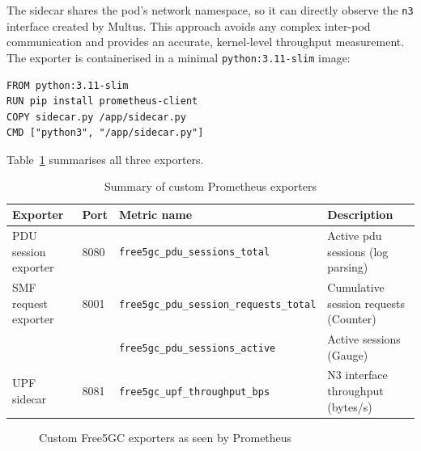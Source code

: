 The sidecar shares the pod's network namespace, so it can directly observe the \texttt{n3} interface created by Multus. This approach avoids any complex inter-pod communication and provides an accurate, kernel-level throughput measurement. The exporter is containerised in a minimal \texttt{python:3.11-slim} image:

\begin{lstlisting}[language=docker, caption={Dockerfile for the UPF sidecar exporter}, label={lst:upf_sidecar_dockerfile}]
FROM python:3.11-slim
RUN pip install prometheus-client
COPY sidecar.py /app/sidecar.py
CMD ["python3", "/app/sidecar.py"]
\end{lstlisting}

Table~\ref{tab:exporters_summary} summarises all three exporters.

\begin{table}[H]
  \centering
  \caption{Summary of custom Prometheus exporters}
  \label{tab:exporters_summary}
  \begin{tabularx}{\linewidth}{lllX}
    \toprule
    \textbf{Exporter}    & \textbf{Port} & \textbf{Metric name} & \textbf{Description} \\
    \midrule
    PDU session exporter & 8080 & \texttt{free5gc\_pdu\_sessions\_total} & Active \gls{pdu} sessions (log parsing) \\
    SMF request exporter & 8001 & \texttt{free5gc\_pdu\_session\_requests\_total} & Cumulative session requests (Counter) \\
                         &      & \texttt{free5gc\_pdu\_sessions\_active} & Active sessions (Gauge) \\
    UPF sidecar          & 8081 & \texttt{free5gc\_upf\_throughput\_bps} & N3 interface throughput (bytes/s) \\
    \bottomrule
  \end{tabularx}
\end{table}

\begin{figure}[H]
  \centering
  \caption{Custom Free5GC exporters as seen by Prometheus}
  \label{fig:prometheus_targets}
\end{figure}

